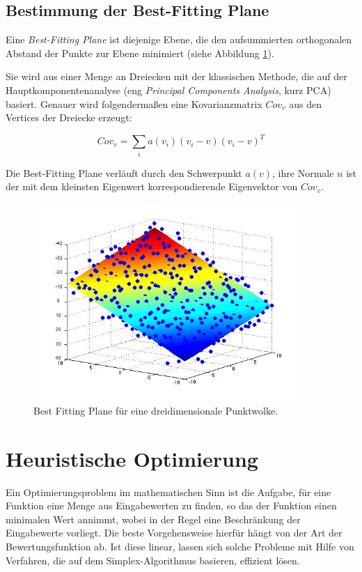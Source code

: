 \subsection{Bestimmung der Best-Fitting Plane}
\label{subsec:pca}

Eine \textit{Best-Fitting Plane} ist diejenige Ebene, die den aufsummierten orthogonalen Abstand der Punkte zur Ebene minimiert (siehe Abbildung \ref{im:pca}).

 Sie wird aus einer Menge an Dreiecken mit der klassischen Methode, die auf der Hauptkomponentenanalyse (eng \textit{Principal Components Analysis}, kurz PCA) basiert. Genauer wird folgenderma{\ss}en eine Kovarianzmatrix  ${Cov}_{v}$ aus den Vertices der Dreiecke erzeugt:

\begin{equation}
{Cov_{v} =  \sum_{i} a(v_{i})(v_{i}-v)(v_{i}-v)^{T}}
\end{equation}

Die Best-Fitting Plane verläuft durch den Schwerpunkt $a(v)$, ihre Normale $n$ ist der mit dem kleinsten Eigenwert korrespondierende Eigenvektor von ${Cov}_{v}$.

\begin{figure}[ht]
\centering
\includegraphics[width=10cm]{graphics/planefit.jpg}
\caption{Best Fitting Plane für eine dreidimensionale Punktwolke.}
\label{im:pca}
\end{figure}

\section{Heuristische Optimierung}
\label{opti}

Ein Optimierungsproblem im mathematischen Sinn ist die Aufgabe, für eine Funktion eine Menge aus Eingabewerten zu finden, so das der Funktion einen minimalen Wert annimmt, wobei in der Regel eine Beschr\"ankung der Eingabewerte vorliegt. Die beste Vorgehensweise hierf\"ur h\"angt von der Art der Bewertungsfunktion ab. Ist diese linear, lassen sich solche Probleme mit Hilfe von Verfahren, die auf dem  Simplex-Algorithmus basieren, effizient l\"osen.

